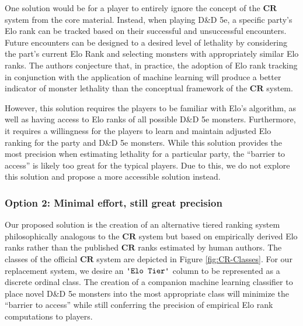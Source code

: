 \documentclass{article}
\newcommand{\CR}{\ensuremath{\mathbf{CR}}\xspace}
\newcommand{\DnD}{D\&D 5e\xspace}
\newcommand{\Column}[1]{\ensuremath{\texttt{\textquotesingle{}#1\textquotesingle{}}}\xspace}
\begin{document}
One solution would be for a player to entirely ignore the concept of the \CR system from the core material. Instead, when playing \DnD, a specific party's Elo rank can be tracked based on their successful and unsuccessful encounters.
Future encounters can be designed to a desired level of lethality by considering the part's current Elo Rank and selecting monsters with appropriately similar Elo ranks.
The authors conjecture that, in practice, the adoption of Elo rank tracking in conjunction with the application of machine learning will produce a better indicator of monster lethality than the conceptual framework of the \CR system.

However, this solution requires the players to be familiar with Elo's algorithm, as well as having access to Elo ranks of all possible \DnD monsters.
Furthermore, it requires a willingness for the players to learn and maintain adjusted Elo ranking for the party and \DnD monsters.
While this solution provides the most precision when estimating lethality for a particular party, the ``barrier to access'' is likely too great for the typical players. Due to this, we do not explore this solution and propose a more accessible solution instead.


\subsubsection{Option 2: Minimal effort, still great precision}

Our proposed solution is the creation of an alternative tiered ranking system philosophically analogous to the \CR system but based on empirically derived Elo ranks rather than the published \CR ranks estimated by human authors.
The classes of the official \CR system are depicted in Figure \ref{fig:CR-Classes}.
For our replacement system, we desire an \Column{Elo Tier} column to be represented as a discrete ordinal class.
The creation of a companion machine learning classifier to place novel \DnD monsters into the most appropriate class will minimize the ``barrier to access'' while still conferring the precision of empirical Elo rank computations to players.
\end{document}

